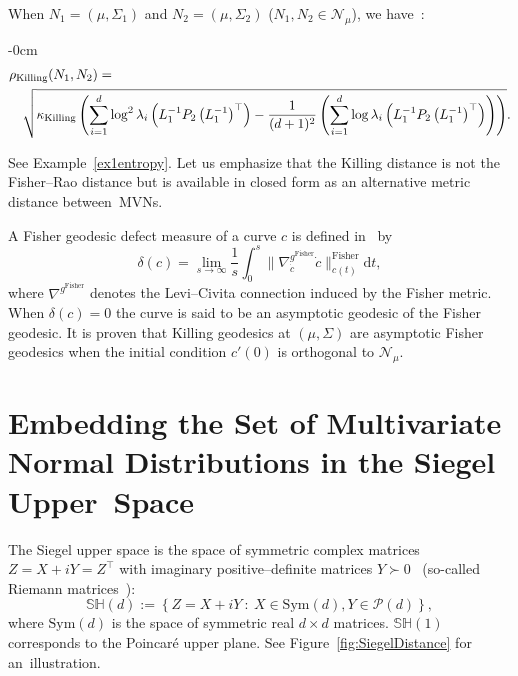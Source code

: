 \documentclass[entropy,article,accept,oneauthor,pdftex,entropy]{Definitions/mdpi}
\def\Sym{\mathrm{Sym}}
\def\SH{\mathbb{SH}}
\def\Sym{\mathrm{Sym}}
\def\Killing{\mathrm{Killing}}
\def\Fisher{\mathrm{Fisher}}
\def\calN{\mathcal{N}}
\def\calP{\mathcal{P}}
\def\dt{\mathrm{d}t}
\def\st{\ :\ }
\begin{document}
When $N_1=(\mu,\Sigma_1)$ and $N_2=(\mu,\Sigma_2)$ ($N_1,N_2\in\calN_\mu$), we have~\cite{lovric2000multivariate}:

\begin{adjustwidth}{-\extralength}{0cm}
\centering %
\begin{eqnarray*}
\lefteqn{\rho_\Killing(N_1,N_2)=}\\
&& \sqrt{
\kappa_\Killing
\left(
\sum_{i=1}^d \log^2\lambda_i\left({L}_1^{-1}{P}_2\left({L}_1^{-1}\right)^\top\right)
-\frac{1}{(d+1)^2}
\left(\sum_{i=1}^d \log\lambda_i\left({L}_1^{-1}{P}_2\left({L}_1^{-1}\right)^\top\right)\right)
\right)
}.
\end{eqnarray*}
\end{adjustwidth}


See Example~\ref{ex1entropy}. Let us emphasize that the Killing distance is not the Fisher–Rao distance but is available in closed form as an alternative metric distance between~MVNs.

A Fisher geodesic defect measure of a curve $c$ is defined in~\cite{globke2021information} by 
$$
\delta(c)=\lim_{s\rightarrow \infty} \frac{1}{s}\int_0^s \|\nabla_{\dot{c}}^{g^\Fisher} \dot{c}\|_{c(t)}^\Fisher \dt,
$$
where $\nabla^{g^\Fisher}$ denotes the Levi–Civita connection induced by the Fisher metric. 
When $\delta(c)=0$ the curve is said to be an asymptotic geodesic of the Fisher geodesic.
It is proven that Killing geodesics at $(\mu,\Sigma)$ are asymptotic Fisher geodesics when the initial condition $c'(0)$ is orthogonal to $\calN_\mu$. 


\section{Embedding the Set of Multivariate Normal Distributions in the Siegel Upper~Space}\label{sec:Siegel}
The Siegel upper space is the space of symmetric complex matrices $Z=X+iY=Z^\top$ with imaginary positive–definite matrices $Y\succ 0$~\cite{siegel2014symplectic,nielsen2020siegel} (so-called Riemann matrices~\cite{frauendiener2019efficient}):
\begin{equation}
\SH(d) := \left\{ Z = X + iY \st X\in\Sym(d), Y\in\calP(d)\right\},
\end{equation}
where $\Sym(d)$ is the space of symmetric real $d\times d$ matrices.
$\SH(1)$ corresponds to the Poincar\'e upper plane.
See Figure~\ref{fig:SiegelDistance} for an~illustration.
\end{document}
